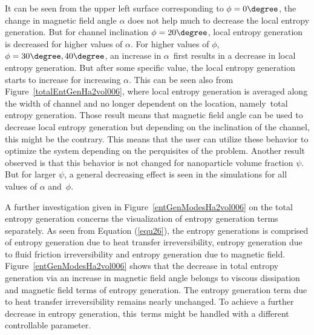 It can be seen from the upper left surface corresponding to $\phi = 0\degree$, the change in magnetic field angle $\alpha$ does not help much to decrease the local entropy generation. But for channel inclination $\phi = 20\degree$, local entropy generation is decreased for higher values of $\alpha$. For higher values of $\phi$, $\phi = 30\degree, 40\degree$, an increase in $\alpha$~first results in a decrease in local entropy generation. But after some specific value, the local entropy generation starts to increase for increasing $\alpha$. This can be seen also from Figure~\ref{totalEntGenHa2vol006}, where local entropy generation is averaged along the width of channel and no longer dependent on the location, namely~total entropy generation. Those result means that magnetic field angle can be used to decrease local entropy generation but depending on the inclination of the channel, this might be the contrary. This means that the user can utilize these behavior to optimize the system depending on the perquisites of the problem. Another result observed is that this behavior is not changed for nanoparticle volume fraction $\psi$. But for larger $\psi$, a general decreasing effect is seen in the simulations for all values of $\alpha$ and~$\phi$.
 

A further investigation given in Figure~\ref{entGenModesHa2vol006} on the total entropy generation concerns the visualization of entropy generation terms separately. As seen from Equation (\ref{equ26}), the entropy generations is comprised of entropy generation due to heat transfer irreversibility, entropy generation due to fluid friction irreversibility and  entropy generation due to magnetic field. Figure~\ref{entGenModesHa2vol006} shows that the decrease in total entropy generation via an increase in magnetic field angle belongs to viscous dissipation and magnetic field terms of entropy generation. The entropy generation term due to heat transfer irreversibility remains nearly unchanged. To achieve a further decrease in entropy generation, this~terms might be handled with a different controllable parameter. 
  


